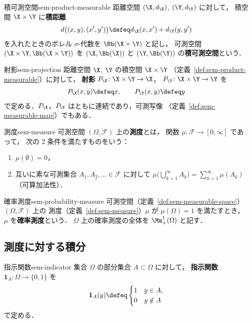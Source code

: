 \begin{definition}{積可測空間}{sem-product-measurable}
  距離空間 $(\X, d_\X)$, $(\Y, d_\Y)$ に対して，
  積空間 $\X \times \Y$ に\textbf{積距離}
  \[
    d\bigl((x, y), (x', y')\bigr) \defeq d_\X(x, x') + d_\Y(y, y')
  \]
  を入れたときのボレル $\sigma$-代数を $\Bb(\X \times \Y)$ と記し，
  可測空間 $(\X \times \Y, \Bb(\X \times \Y))$ を
  $(\X, \Bb(\X))$ と $(\Y, \Bb(\Y))$ の\textbf{積可測空間}という．
\end{definition}

\begin{definition}{射影}{sem-projection}
  距離空間 $\X$, $\Y$ の積空間 $\X \times \Y$
  （定義~\ref{def:sem-product-measurable}）に対して，
  \textbf{射影} $P_\X \colon \X \times \Y \to \X$，
  $P_\Y \colon \X \times \Y \to \Y$ を
  \[
    P_\X(x, y) \defeq x,
    \qquad
    P_\Y(x, y) \defeq y
  \]
  で定める．$P_\X$，$P_\Y$ はともに連続であり，可測写像
  （定義~\ref{def:sem-measurable-map}）でもある．
\end{definition}

\begin{definition}{測度}{sem-measure}
  可測空間 $(\Omega, \mathcal{F})$ 上の\textbf{測度}とは，
  関数 $\mu \colon \mathcal{F} \to [0, \infty]$ であって，
  次の 2 条件を満たすものをいう：
  \begin{enumerate}
    \item[(i)] $\mu(\emptyset) = 0$，
    \item[(ii)] 互いに素な可測集合 $A_1, A_2, \ldots \in \mathcal{F}$ に対して
      $\mu\bigl(\bigcup_{k=1}^{\infty} A_k\bigr) = \sum_{k=1}^{\infty} \mu(A_k)$
      （可算加法性）．
  \end{enumerate}
\end{definition}

\begin{definition}{確率測度}{sem-probability-measure}
  可測空間（定義~\ref{def:sem-measurable-space}）$(\Omega, \mathcal{F})$ 上の
  測度（定義~\ref{def:sem-measure}）$\mu$ が $\mu(\Omega) = 1$ を満たすとき，
  $\mu$ を\textbf{確率測度}という．
  $\Omega$ 上の確率測度の全体を $\Mm_+^1(\Omega)$ と記す．
\end{definition}

\subsection{測度に対する積分}
\label{sec:sem-integration}

\begin{definition}{指示関数}{sem-indicator}
  集合 $\Omega$ の部分集合 $A \subset \Omega$ に対して，
  \textbf{指示関数} $\mathbf{1}_A \colon \Omega \to \{0, 1\}$ を
  \[
    \mathbf{1}_A(y) \defeq
    \begin{cases}
      1 & y \in A, \\
      0 & y \notin A
    \end{cases}
  \]
  で定める．
\end{definition}

